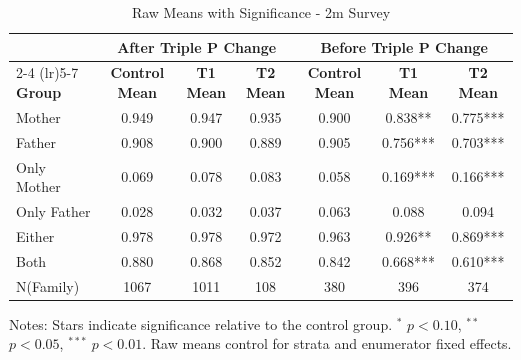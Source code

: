 \begin{table}[htbp]
\centering
\begin{threeparttable}
\caption{Raw Means with Significance  - 2m Survey}
\begin{tabular}{lcccccc}
\toprule
& \multicolumn{3}{c}{After Triple P Change} & \multicolumn{3}{c}{Before Triple P Change} \\
\cmidrule(lr){2-4} \cmidrule(lr){5-7}
\textbf{Group} & \textbf{Control Mean} & \textbf{T1 Mean} & \textbf{T2 Mean} & \textbf{Control Mean} & \textbf{T1 Mean} & \textbf{T2 Mean} \\
\midrule
Mother &  0.949 &  0.947 &  0.935  &  0.900 &  0.838** &  0.775*** \\
Father &  0.908 &  0.900 &  0.889 &  0.905 &  0.756*** &  0.703*** \\
Only Mother &  0.069 &  0.078 &  0.083  & 0.058 &  0.169*** &  0.166***   \\
Only Father &  0.028 &  0.032 &  0.037 & 0.063 &  0.088 &  0.094 \\
Either &  0.978 &  0.978 &  0.972 &  0.963 &  0.926** &  0.869*** \\
Both &  0.880 &  0.868 &  0.852 &  0.842 &  0.668*** &  0.610*** \\
N(Family) & 1067 & 1011 & 108 & 380 & 396 & 374 \\
\bottomrule
\end{tabular}
\begin{tablenotes}
\small
Notes: Stars indicate significance relative to the control group. 
$^{*}$ $p<0.10$, $^{**}$ $p<0.05$, $^{***}$ $p<0.01$.
Raw means control for strata and enumerator fixed effects.
\end{tablenotes}
\end{threeparttable}
\end{table}

